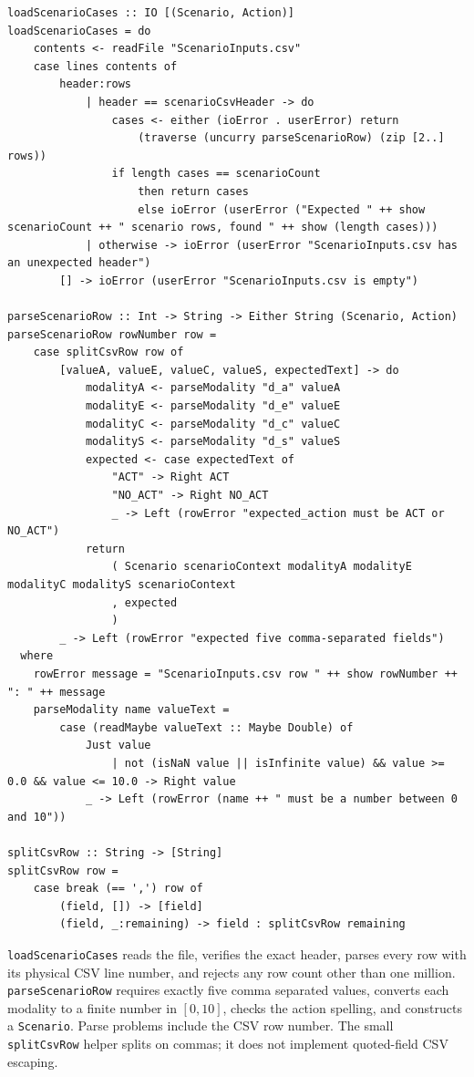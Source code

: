 \documentclass[11pt]{article}
\begin{document}
\begin{lstlisting}
loadScenarioCases :: IO [(Scenario, Action)]
loadScenarioCases = do
    contents <- readFile "ScenarioInputs.csv"
    case lines contents of
        header:rows
            | header == scenarioCsvHeader -> do
                cases <- either (ioError . userError) return
                    (traverse (uncurry parseScenarioRow) (zip [2..] rows))
                if length cases == scenarioCount
                    then return cases
                    else ioError (userError ("Expected " ++ show scenarioCount ++ " scenario rows, found " ++ show (length cases)))
            | otherwise -> ioError (userError "ScenarioInputs.csv has an unexpected header")
        [] -> ioError (userError "ScenarioInputs.csv is empty")

parseScenarioRow :: Int -> String -> Either String (Scenario, Action)
parseScenarioRow rowNumber row =
    case splitCsvRow row of
        [valueA, valueE, valueC, valueS, expectedText] -> do
            modalityA <- parseModality "d_a" valueA
            modalityE <- parseModality "d_e" valueE
            modalityC <- parseModality "d_c" valueC
            modalityS <- parseModality "d_s" valueS
            expected <- case expectedText of
                "ACT" -> Right ACT
                "NO_ACT" -> Right NO_ACT
                _ -> Left (rowError "expected_action must be ACT or NO_ACT")
            return
                ( Scenario scenarioContext modalityA modalityE modalityC modalityS scenarioContext
                , expected
                )
        _ -> Left (rowError "expected five comma-separated fields")
  where
    rowError message = "ScenarioInputs.csv row " ++ show rowNumber ++ ": " ++ message
    parseModality name valueText =
        case (readMaybe valueText :: Maybe Double) of
            Just value
                | not (isNaN value || isInfinite value) && value >= 0.0 && value <= 10.0 -> Right value
            _ -> Left (rowError (name ++ " must be a number between 0 and 10"))

splitCsvRow :: String -> [String]
splitCsvRow row =
    case break (== ',') row of
        (field, []) -> [field]
        (field, _:remaining) -> field : splitCsvRow remaining
\end{lstlisting}

\texttt{loadScenarioCases} reads the file, verifies the exact header, parses
every row with its physical CSV line number, and rejects any row count other
than one million. \texttt{parseScenarioRow} requires exactly five comma
separated values, converts each modality to a finite number in \([0,10]\),
checks the action spelling, and constructs a \texttt{Scenario}. Parse
problems include the CSV row number. The small \texttt{splitCsvRow} helper
splits on commas; it does not implement quoted-field CSV escaping.
\end{document}
